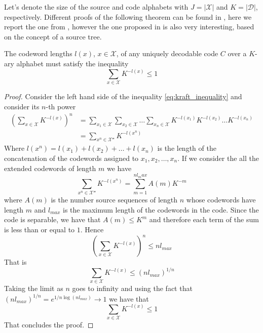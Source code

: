 \noindent Let's denote the size of the source and code alphabets with $J = |\mathcal{X}|$ and $K = |\mathcal{D}|$, respectively. Different proofs of the following theorem can be found in \cite{ElementsofInformationTheory,han2002mathematics}, here we report the one from \cite{han2002mathematics}, however the one proposed in \cite{ElementsofInformationTheory} is also very interesting, based on the concept of a source tree.

\begin{theorem}\label{thm:kraft_inequality}
    The codeword lengths $l(x)$, $x \in \mathcal{X}$, of any uniquely decodable code $C$ over a $K$-ary alphabet must satisfy the inequality
    \begin{equation}\label{eq:kraft_inequality}
        \sum_{x\in\mathcal{X}} K^{-l(x)} \leq 1
    \end{equation}
\end{theorem}
\begin{proof}
    Consider the left hand side of the inequality \ref{eq:kraft_inequality} and consider its $n$-th power
    \begin{align}
        \left( \sum_{x\in\mathcal{X}} K^{-l(x)} \right)^n & = \sum_{x_1\in\mathcal{X}} \sum_{x_2\in\mathcal{X}} \ldots \sum_{x_n\in\mathcal{X}} K^{-l(x_1)} K^{-l(x_2)} \ldots K^{-l(x_n)} \nonumber \\
                                                          & = \sum_{x^n \in\mathcal{X^n}} K^{-l(x^n)}
    \end{align}
    Where $l(x^n) = l(x_1) + l(x_2) + \ldots + l(x_n)$ is the length of the concatenation of the codewords assigned to $x_1, x_2, \ldots, x_n$. If we consider the all the extended codewords of length $m$ we have
    \begin{equation}
        \sum_{x^n \in\mathcal{X^n}} K^{-l(x^n)} = \sum_{m=1}^{n l_max} A(m) K^{-m}
    \end{equation}
    where $A(m)$ is the number source sequences of length $n$ whose codewords have length $m$ and $l_{max}$ is the maximum length of the codewords in the code. Since the code is separable, we have that $A(m) \leq K^m$ and therefore each term of the sum is less than or equal to $1$. Hence
    \begin{equation}
        \left( \sum_{x\in\mathcal{X}} K^{-l(x)} \right)^n \leq n l_{max}
    \end{equation}
    That is
    \begin{equation}
        \sum_{x\in\mathcal{X}} K^{-l(x)} \leq (n l_{max})^{1/n}
    \end{equation}
    Taking the limit as $n$ goes to infinity and using the fact that $(n l_{max})^{1/n} = e^{1/n \log (n l_{max})} \to 1$ we have that
    \begin{equation}
        \sum_{x\in\mathcal{X}} K^{-l(x)} \leq 1
    \end{equation}
    That concludes the proof.
\end{proof}

